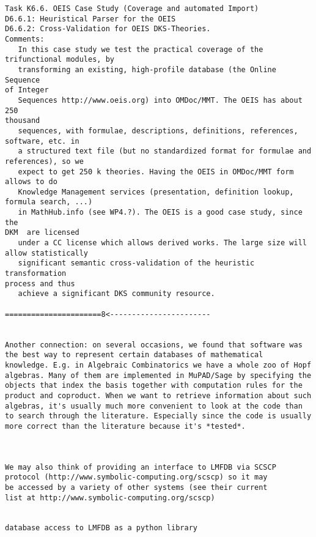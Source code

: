 \begin{Workpackage}{\thewpno}
\begin{verbatim}
Task K6.6. OEIS Case Study (Coverage and automated Import)
D6.6.1: Heuristical Parser for the OEIS
D6.6.2: Cross-Validation for OEIS DKS-Theories.
Comments:
   In this case study we test the practical coverage of the
trifunctional modules, by
   transforming an existing, high-profile database (the Online Sequence
of Integer
   Sequences http://www.oeis.org) into OMDoc/MMT. The OEIS has about 250
thousand
   sequences, with formulae, descriptions, definitions, references,
software, etc. in
   a structured text file (but no standardized format for formulae and
references), so we
   expect to get 250 k theories. Having the OEIS in OMDoc/MMT form
allows to do
   Knowledge Management services (presentation, definition lookup,
formula search, ...)
   in MathHub.info (see WP4.?). The OEIS is a good case study, since the
DKM  are licensed
   under a CC license which allows derived works. The large size will
allow statistically
   significant semantic cross-validation of the heuristic transformation
process and thus
   achieve a significant DKS community resource.

======================8<-----------------------


Another connection: on several occasions, we found that software was
the best way to represent certain databases of mathematical
knowledge. E.g. in Algebraic Combinatorics we have a whole zoo of Hopf
algebras. Many of them are implemented in MuPAD/Sage by specifying the
objects that index the basis together with computation rules for the
product and coproduct. When we want to retrieve information about such
algebras, it's usually much more convenient to look at the code than
to search through the literature. Especially since the code is usually
more correct than the literature because it's *tested*.



We may also think of providing an interface to LMFDB via SCSCP
protocol (http://www.symbolic-computing.org/scscp) so it may
be accessed by a variety of other systems (see their current
list at http://www.symbolic-computing.org/scscp)


database access to LMFDB as a python library


\end{verbatim}
\end{Workpackage}
